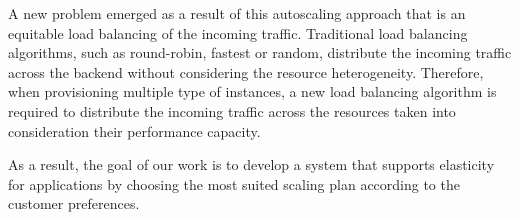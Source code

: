 A new problem emerged as a result of this autoscaling approach that is an equitable load balancing of the incoming traffic. Traditional load balancing algorithms, such as round-robin, fastest or random, distribute the incoming traffic across the backend without considering the resource heterogeneity. Therefore, when provisioning multiple type of instances, a new load balancing algorithm is required to distribute the incoming traffic across the resources taken into consideration their performance capacity. 

As a result, the goal of our work is to develop a system that supports elasticity for applications by choosing the most suited scaling plan according to the customer preferences.















